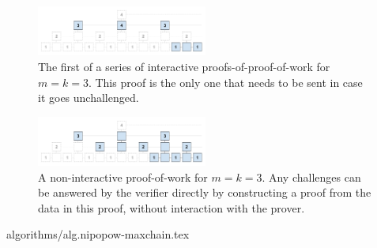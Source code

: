 \begin{figure}[h]
    \caption{The first of a series of interactive proofs-of-proof-of-work for
    $m = k = 3$. This proof is the only one that needs to be sent in case it
    goes unchallenged.}
    \centering
    \includegraphics[width=0.5\textwidth,keepaspectratio]{figures/interactive-popow.png}
\end{figure}

\begin{figure}[h]
    \caption{A non-interactive proof-of-work for $m = k = 3$. Any challenges
    can be answered by the verifier directly by constructing a proof from the
    data in this proof, without interaction with the prover.}
    \centering
    \includegraphics[width=0.5\textwidth,keepaspectratio]{figures/non-interactive-popow.png}
\end{figure}

{algorithms/alg.nipopow-maxchain.tex}
